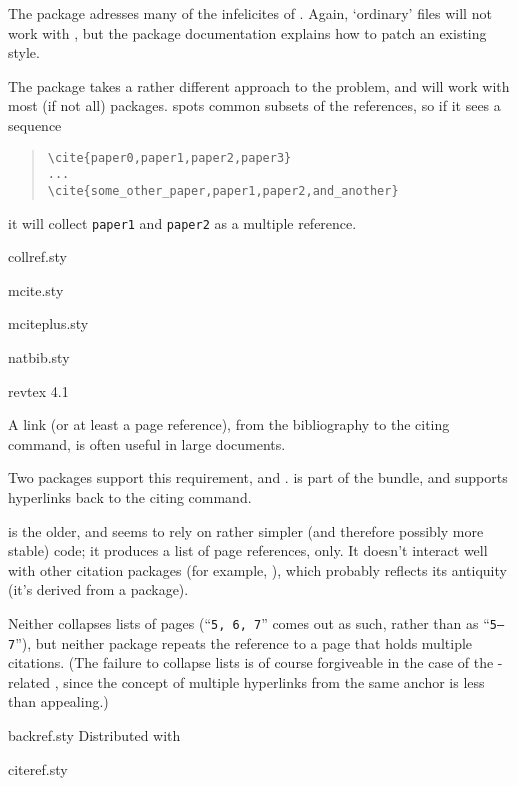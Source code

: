 The  package adresses many of the infelicites of
.  Again, `ordinary'  files will not
work with , but the package documentation explains
how to patch an existing \BibTeX{} style.

The  package takes a rather different approach to the
problem, and will work with most (if not all) \BibTeX{} packages.
 spots common subsets of the references, so if it
sees a sequence
\begin{quote}
\begin{verbatim}
\cite{paper0,paper1,paper2,paper3}
...
\cite{some_other_paper,paper1,paper2,and_another}
\end{verbatim}
\end{quote}
it will collect \texttt{paper1} and \texttt{paper2} as a multiple reference.
\begin{ctanrefs}
\item[collref.sty]
\item[mcite.sty]
\item[mciteplus.sty]
\item[natbib.sty]
\item[revtex 4.1]
\end{ctanrefs}


A link (or at least a page reference), from the bibliography to the
citing command, is often useful in large documents.

Two packages support this requirement,  and
.   is part of the
 bundle, and supports hyperlinks back to the citing
command.

 is the older, and seems to rely on rather simpler
(and therefore possibly more stable) code; it produces a list of page
references, only.  It doesn't interact well with other citation
packages (for example, ), which probably reflects its
antiquity (it's derived from a \LaTeXo{} package).

Neither collapses
lists of pages (``\texttt{5, 6, 7}'' comes out as such, rather than as
``\texttt{5--7}''), but neither package repeats the reference to a page that
holds multiple citations.  (The failure to collapse lists is of course
forgiveable in the case of the -related
, since the concept of multiple hyperlinks from the
same anchor is less than appealing.)
\begin{ctanrefs}
\item[backref.sty]Distributed with 
\item[citeref.sty]
\end{ctanrefs}

